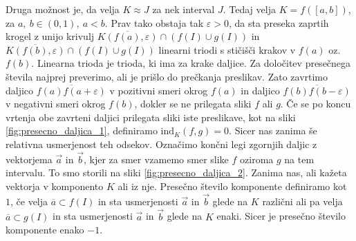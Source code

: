 \documentclass[mat1]{fmfdelo}
\newcommand{\ind}[3][]{\text{ind}_{#1}(#2, #3)}
\begin{document}
Druga možnost je, da velja $K \approx J$ za nek interval $J$. Tedaj velja $K = f([a, b])$, za $a,\ b \in (0, 1),\ a < b.$ Prav tako obstaja tak $\varepsilon > 0$, da sta preseka zaprtih krogel z unijo krivulj $\overline{K(f(a), \varepsilon)} \cap (f(I) \cup g(I))$ in $\overline{K(f(b), \varepsilon)} \cap (f(I) \cup g(I))$ linearni triodi s stičišči krakov v $f(a)$ oz. $f(b).$ Linearna trioda je trioda, ki ima za krake daljice. Za določitev presečnega števila najprej preverimo, ali je prišlo do prečkanja preslikav. Zato zavrtimo daljico $\overline{f(a)f(a+\varepsilon)}$ v pozitivni smeri okrog $f(a)$ in daljico $\overline{f(b)f(b-\varepsilon)}$ v negativni smeri okrog $f(b)$, dokler se ne prilegata sliki $f$ ali $g$. Če se po koncu vrtenja obe zavrteni daljici prilegata sliki iste preslikave, kot na sliki \ref{fig:presecno_daljica_1}, definiramo $\ind[K]{f}{g} = 0.$ Sicer nas zanima še relativna usmerjenost teh odsekov. Označimo končni legi zgornjih daljic z vektorjema $\overrightarrow{a}$ in $\overrightarrow{b}$, kjer za smer vzamemo smer slike $f$ oziroma $g$ na tem intervalu. To smo storili na sliki \ref{fig:presecno_daljica_2}. Zanima nas, ali kažeta vektorja v komponento $K$ ali iz nje. Presečno število komponente definiramo kot $1$, če velja $\overline{a} \subset f(I)$ in sta usmerjenosti $\overrightarrow{a}$ in $\overrightarrow{b}$ glede na $K$ različni ali pa velja $\overline{a} \subset g(I)$ in sta usmerjenosti $\overrightarrow{a}$ in $\overrightarrow{b}$ glede na $K$ enaki. Sicer je presečno število komponente enako $-1$. 
\end{document}
